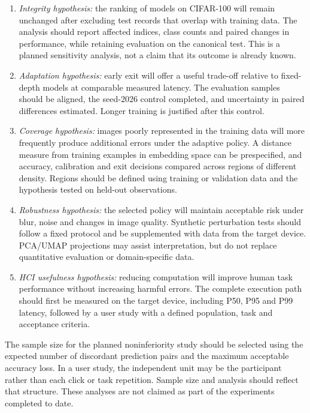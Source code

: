 \documentclass[12pt,a4paper]{article}
\begin{document}
\begin{enumerate}
\item \emph{Integrity hypothesis:} the ranking of models on CIFAR-100
will remain unchanged after excluding test records that overlap
with training data.
The analysis should report affected indices, class counts and paired
changes in performance, while retaining evaluation on the canonical test.
This is a planned sensitivity analysis, not a claim that its outcome
is already known.
\item \emph{Adaptation hypothesis:} early exit will offer a useful
trade-off relative to fixed-depth models at comparable measured latency.
The evaluation samples should be aligned, the seed-2026 control completed,
and uncertainty in paired differences estimated.
Longer training is justified after this control.
\item \emph{Coverage hypothesis:} images poorly represented in the
training data will more frequently produce additional errors under
the adaptive policy.
A distance measure from training examples in embedding space can be
prespecified, and accuracy, calibration and exit decisions compared
across regions of different density.
Regions should be defined using training or validation data and
the hypothesis tested on held-out observations.
\item \emph{Robustness hypothesis:} the selected policy will maintain
acceptable risk under blur, noise and changes in image quality.
Synthetic perturbation tests should follow a fixed protocol and
be supplemented with data from the target device.
PCA/UMAP projections may assist interpretation, but do not replace
quantitative evaluation or domain-specific data.
\item \emph{HCI usefulness hypothesis:} reducing computation will
improve human task performance without increasing harmful errors.
The complete execution path should first be measured on the target
device, including P50, P95 and P99 latency, followed by a user study
with a defined population, task and acceptance criteria.
\end{enumerate}

The sample size for the planned noninferiority study should be selected
using the expected number of discordant prediction pairs and the maximum
acceptable accuracy loss.
In a user study, the independent unit may be the participant rather
than each click or task repetition.
Sample size and analysis should reflect that structure.
These analyses are not claimed as part of the experiments completed
to date.
\end{document}
